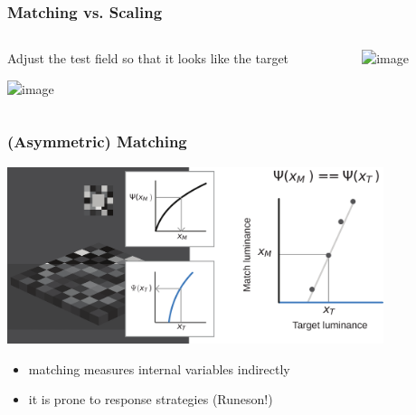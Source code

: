 \documentclass[]{beamer}
\begin{document}
\begin{frame}
\frametitle{Matching vs. Scaling}
\begin{overlayarea}{110mm}{70mm}

\begin{columns}[T]
 \begin{column}{55mm}
\centering Adjust the test field so that it looks like the target
  \begin{center}
\includegraphics<1->[width=50mm]{figs/l6/ruler_matching.png}
 \end{center}
 \end{column}

 \begin{column}{55mm}
  \begin{center}
\includegraphics<2->[width=50mm]{figs/l6/ruler_mlds.png}
 \end{center}
 \end{column}
\end{columns}
\end{overlayarea}
\end{frame}



\begin{frame}
\frametitle{(Asymmetric) Matching}
\begin{overlayarea}{110mm}{60mm}
  \begin{center}
\includegraphics[width=110mm]{figs/l6/internal_functions_matching.png}
 \end{center}
\end{overlayarea}
\begin{itemize}
 \item<2-> matching measures internal variables indirectly
 \item<2-> it is prone to response strategies (Runeson!)
\end{itemize}
\end{frame}
\end{document}
